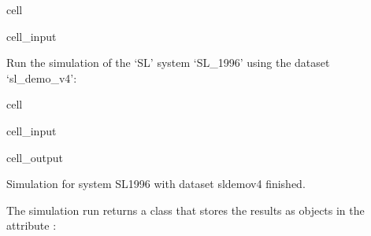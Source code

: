 \documentclass[letterpaper,10pt,english]{sphinxmanual}
\begin{document}
\begin{sphinxuseclass}{cell}
\begin{sphinxuseclass}{cell_input}
\begin{sphinxVerbatim}[commandchars=\\\{\}]
   
  
\end{sphinxVerbatim}

\end{sphinxuseclass}
\end{sphinxuseclass}
\sphinxAtStartPar
Run the simulation of the ‘SL’ system ‘SL\_1996’ using the dataset ‘sl\_demo\_v4’:

\begin{sphinxuseclass}{cell}
\begin{sphinxuseclass}{cell_input}
\begin{sphinxVerbatim}[commandchars=\\\{\}]
\PYG{p}{[}\PYG{p}{]}\PYG{p}{[}\PYG{p}{]}
\end{sphinxVerbatim}

\end{sphinxuseclass}
\begin{sphinxuseclass}{cell_output}
\begin{sphinxVerbatim}[commandchars=\\\{\}]
Simulation for system SL\PYGZus{}1996 with dataset sl\PYGZus{}demo\PYGZus{}v4 finished.
\end{sphinxVerbatim}

\end{sphinxuseclass}
\end{sphinxuseclass}
\sphinxAtStartPar
The simulation run returns a  class that stores the results as  objects in the attribute :
\end{document}
